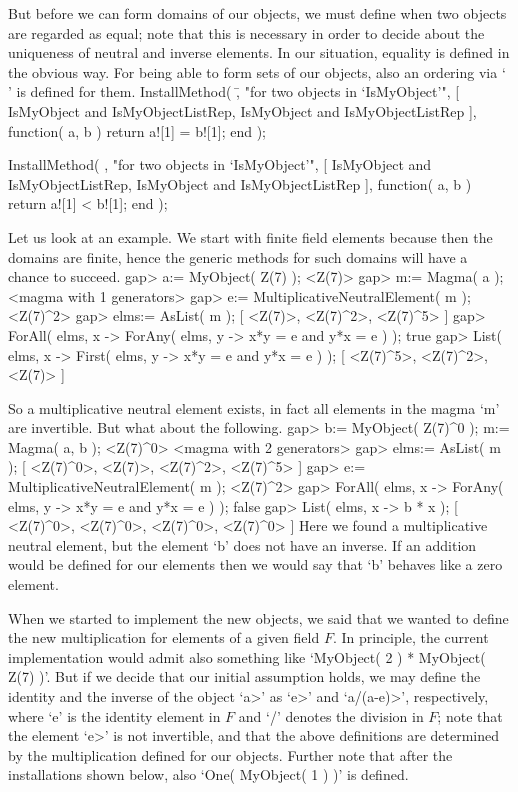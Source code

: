 But before we can form domains of our objects,
we must define when two objects are regarded as equal;
note that this is necessary in order to decide about the uniqueness
of neutral and inverse elements.
In our situation, equality is defined in the obvious way.
For being able to form sets of our objects,
also an ordering via `\\\<' is defined for them.
\begintt
InstallMethod( \=,
    "for two objects in `IsMyObject'",
    [ IsMyObject and IsMyObjectListRep,
      IsMyObject and IsMyObjectListRep ],
    function( a, b )
    return a![1] = b![1];
    end );

InstallMethod( \<,
    "for two objects in `IsMyObject'",
    [ IsMyObject and IsMyObjectListRep,
      IsMyObject and IsMyObjectListRep ],
    function( a, b )
    return a![1] < b![1];
    end );
\endtt

Let us look at an example.
We start with finite field elements because then the domains are finite,
hence the generic methods for such domains will have a chance to succeed.
\begintt
gap> a:= MyObject( Z(7) );
<Z(7)>
gap> m:= Magma( a );
<magma with 1 generators>
gap> e:= MultiplicativeNeutralElement( m );
<Z(7)^2>
gap> elms:= AsList( m );
[ <Z(7)>, <Z(7)^2>, <Z(7)^5> ]
gap> ForAll( elms, x -> ForAny( elms, y -> x*y = e and y*x = e ) );
true
gap> List( elms, x -> First( elms, y -> x*y = e and y*x = e ) );   
[ <Z(7)^5>, <Z(7)^2>, <Z(7)> ]
\endtt

So a multiplicative neutral element exists,
in fact all elements in the magma `m' are invertible.
But what about the following.
\begintt
gap> b:= MyObject( Z(7)^0 );  m:= Magma( a, b );
<Z(7)^0>
<magma with 2 generators>
gap> elms:= AsList( m );
[ <Z(7)^0>, <Z(7)>, <Z(7)^2>, <Z(7)^5> ]
gap> e:= MultiplicativeNeutralElement( m );
<Z(7)^2>
gap> ForAll( elms, x -> ForAny( elms, y -> x*y = e and y*x = e ) );
false
gap> List( elms, x -> b * x );
[ <Z(7)^0>, <Z(7)^0>, <Z(7)^0>, <Z(7)^0> ]
\endtt
Here we found a multiplicative neutral element,
but the element `b' does not have an inverse.
If an addition would be defined for our elements then we would say
that `b' behaves like a zero element.

When we started to implement the new objects,
we said that we wanted to define the new multiplication for elements
of a given field $F$.
In principle, the current implementation would admit also something
like `MyObject( 2 ) * MyObject( Z(7) )'.
But if we decide that our initial assumption holds,
we may define the identity and the inverse of the object `\<a>' as
`\*e>' and `\<a/(a-e)>', respectively,
where `e' is the identity element in $F$ and `/' denotes the division
in $F$; 
note that the element `\<e>' is not invertible,
and that the above definitions are determined by the multiplication
defined for our objects.
Further note that after the installations shown below,
also `One( MyObject( 1 ) )' is defined.

